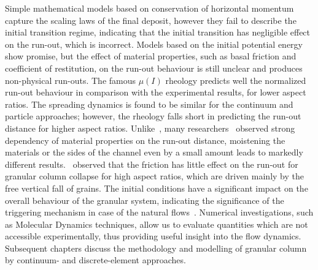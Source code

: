 Simple mathematical models based on conservation of horizontal momentum capture 
the scaling laws of the final deposit, however they fail to describe the 
initial transition regime, indicating that the initial transition has 
negligible effect on the run-out, which is incorrect. Models based on the 
initial potential energy show promise, but the effect of material properties, 
such as basal friction and coefficient of restitution, on the run-out behaviour 
is still unclear and produces non-physical run-outs. The famous 
$\mu(\textit{I})$ rheology predicts well the normalized run-out behaviour in 
comparison with the experimental results, for lower aspect ratios. The 
spreading dynamics is found to be similar for the continuum and particle 
approaches; however, the rheology falls short in predicting the run-out 
distance for higher aspect ratios. Unlike~\citet{Lube2005}, many 
researchers~\citep{Balmforth2005,Kerswell2005dam} observed strong dependency of 
material properties on the run-out distance, moistening the materials or the 
sides of the channel even by a small amount leads to markedly different 
results.~\citet{Staron2007} observed that the friction has little effect on the 
run-out for granular column collapse for high aspect ratios, which are driven 
mainly by the free vertical fall of grains. The initial conditions have a 
significant impact on the overall behaviour of the granular system, indicating 
the significance of the triggering mechanism in case of the natural 
flows~\citep{Staron2007}. Numerical investigations, such as Molecular Dynamics 
techniques, allow us to evaluate quantities which are not accessible 
experimentally, thus providing useful insight into the flow dynamics. 
Subsequent chapters discuss the methodology and modelling of granular column by 
continuum- and discrete-element approaches.

